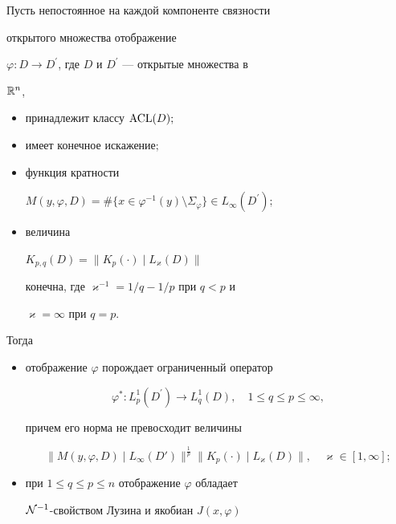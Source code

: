 \begin{thm}


Пусть непостоянное на каждой компоненте связности


открытого множества отображение 


$\varphi : D\to D^{\prime}$, где $D$ и $D^{\prime}$ --- открытые множества в


${\Bbb R}^n$,


\begin{itemize}


\item[a)] принадлежит классу $\operatorname{ACL}(D);$


\item[b)] имеет конечное искажение\/$;$


\item[c)] функция кратности


$M(y,\varphi,D)=\#\{x\in\varphi^{-1}(y)


\setminus\Sigma_\varphi\}\in L_{\infty}(D^{\prime});$


\item[d)] величина


$K_{p,q}(D)=\|K_p(\cdot)\mid L_{\varkappa}(D)\|$


конечна, где $\varkappa^{-1}= 1/q - 1/p$ при $q<p$ и


$\varkappa=\infty$ при $q=p$.


\end{itemize}


Тогда


\begin{itemize}


\item[1)] отображение $\varphi$ порождает ограниченный оператор


$$


\varphi^{*} :L_{p}^{1}(D^{\prime})\to L_{q}^{1}(D),\quad 1\leq


q\leq p\leq \infty,


$$


причем его норма не превосходит величины


$$


\|M(y,\varphi,D)\mid L_{\infty}(D')\|^{\frac{1}{p}}


\|K_p(\cdot)\mid L_{\varkappa}(D)\bigr\|,\quad \varkappa\in[1,\infty];


$$


\item[2)] при $1\leq q\leq p\leq n$ отображение $\varphi$ обладает


${\cal N}^{-1}$-свойством Лузина и якобиан $J(x,\varphi)$



\end{itemize}
\end{thm}
